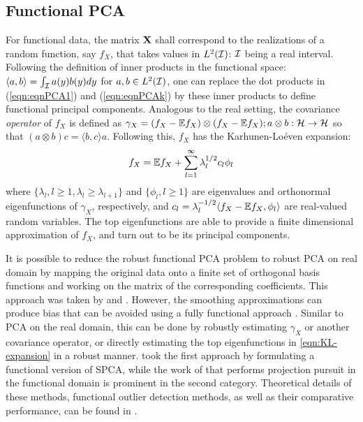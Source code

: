 \subsection*{\sffamily \large Functional PCA}
For functional data, the matrix ${\mathbf{X}}$ shall correspond to the realizations of a random function, say $f_X$, that takes values in $L^2 ({\cal{I}})$: ${\cal{I}}$ being a real interval. Following the definition of inner products in the functional space: $ \langle a, b \rangle = \int_{\cal{I}} a(y) b(y) dy$ for $a,b \in L^2 ({\cal{I}})$, one can replace the dot products in (\ref{eqn:eqnPCA1}) and (\ref{eqn:eqnPCAk}) by these inner products to define functional principal components. Analogous to the real setting, the covariance {\it operator} of $f_X$ is defined as $\gamma_X = (f_X - {\mathbb{E}} f_X) \otimes (f_X - {\mathbb{E}} f_X); a \otimes b: {\cal{H}} \rightarrow {\cal{H}}$ so that $(a \otimes b)c = \langle b,c \rangle a$. Following this, $f_X$ has the Karhunen-Lo\'{e}ven expansion:
%
\begin{align}\label{eqn:KL-expansion}
f_X = {\mathbb{E}} f_X + \sum_{l=1}^\infty \lambda_l^{1/2} c_l \phi_l
\end{align}
%
where $\{ \lambda_l, l \geq 1, \lambda_l \geq \lambda_{l+1} \}$ and $\{ \phi_l, l \geq 1\}$ are eigenvalues and orthonormal eigenfunctions of $\gamma_X$, respectively, and $c_l = \lambda_l^{-1/2}  \langle f_X - {\mathbb{E}} f_X , \phi_l\rangle$ are real-valued random variables. The top eigenfunctions are able to provide a finite dimensional approximation of $f_X$, and turn out to be its principal components.

It is possible to reduce the robust functional PCA problem to robust PCA on real domain by mapping the original data onto a finite set of orthogonal basis functions and working on the matrix of the corresponding coefficients. This approach was taken by \cite{LocantoreEtal99} and \cite{BoenteBarrera15}. However, the smoothing approximations can produce bias that can be avoided using a fully functional approach \citep{ZhangChen07}. Similar to PCA on the real domain, this can be done by robustly estimating $\gamma_X$ or another covariance operator, or directly estimating the top eigenfunctions in \eqref{eqn:KL-expansion} in a robust manner. \cite{Gervini08} took the first approach by formulating a functional version of SPCA, while the work of \cite{BaliEtal11} that performs projection pursuit in the functional domain is prominent in the second category. Theoretical details of these methods, functional outlier detection methods, as well as their comparative performance, can be found in \cite{BaliBoenteReview}.

